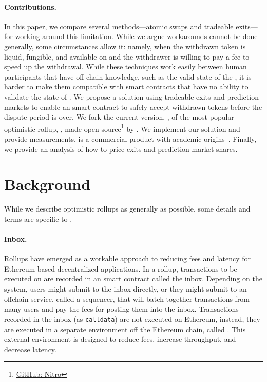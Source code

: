 \paragraph{Contributions.} In this paper, we compare several methods---atomic swaps and tradeable exits---for working around this limitation. While we argue workarounds cannot be done generally, some circumstances allow it: namely, when the withdrawn token is liquid, fungible, and available on \layerone and the withdrawer is willing to pay a fee to speed up the withdrawal.  While these techniques work easily between human participants that have off-chain knowledge, such as the valid state of the \layertwo, it is harder to make them compatible with \layerone smart contracts that have no ability to validate the state of \layertwo. We propose a solution using tradeable exits and prediction markets to enable an \layerone smart contract to safely accept withdrawn tokens before the dispute period is over. We fork the current version, \nitro, of the most popular optimistic rollup, \arb, made open source\footnote{\href{https://github.com/OffchainLabs/nitro}{GitHub: Nitro}} by \offchain. We implement our solution and provide measurements. \arb is a commercial product with academic origins~\cite{kalodner2018arbitrum}. Finally, we provide an analysis of how to price exits and prediction market shares.  


 

\section{Background} 

While we describe optimistic rollups as generally as possible, some details and terms are specific to \arb. 

\paragraph{Inbox.} Rollups have emerged as a workable approach to reducing fees and latency for Ethereum-based decentralized applications. In a rollup,  transactions to be executed on \layertwo are recorded in an \layerone smart contract called the inbox. Depending on the system, users might submit to the inbox directly, or they might submit to an offchain service, called a sequencer, that will batch together transactions from many users and pay the \layerone fees for posting them into the inbox. Transactions recorded in the inbox (as \texttt{calldata}) are not executed on Ethereum, instead, they are executed in a separate environment off the Ethereum chain, called \layertwo. This external environment is designed to reduce fees, increase throughput, and decrease latency. 

